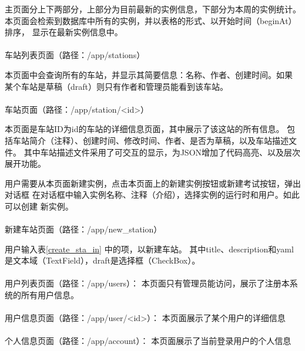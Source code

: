 主页面分上下两部分，上部分为目前最新的实例信息，下部分为本周的实例统计。
本页面会检索到数据库中所有的实例，并以表格的形式、以开始时间（beginAt）排序，
显示在最新实例信息中。

\paragraph{} 车站列表页面（路径：/app/stations）

本页面中会查询所有的车站，并显示其简要信息：名称、作者、创建时间。如果
某个车站是草稿（draft）则只有作者和管理员能看到该车站。

\paragraph{} 车站页面（路径：/app/station/<id>）

本页面是车站ID为id的车站的详细信息页面，其中展示了该这站的所有信息。
包括车站简介（注释）、创建时间、修改时间、作者、是否为草稿，以及车站描述文件。
其中车站描述文件采用了可交互的显示，为JSON增加了代码高亮、以及层次展开功能。

用户需要从本页面新建实例，点击本页面上的新建实例按钮或新建考试按钮，弹出对话框
在对话框中输入实例名称、注释（介绍），选择实例的运行时和用户。如此可以创建
新实例。

\paragraph{} 新建车站页面（路径：/app/new\_station）

用户输入表\ref{create_sta_in} 中的项，以新建车站。
其中title、description和yaml是文本域（TextField），draft是选择框（CheckBox）。

\paragraph{} 用户列表页面（路径：/app/users）：
本页面只有管理员能访问，展示了注册本系统的所有用户信息。

\paragraph{} 用户信息页面（路径：/app/user/<id>）：
本页面展示了某个用户的详细信息

\paragraph{} 个人信息页面（路径：/app/account）：
本页面展示了当前登录用户的个人信息

